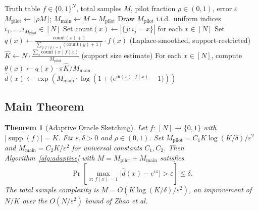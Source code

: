 \documentclass[11pt]{article}
\newtheorem{theorem}{Theorem}
\DeclareMathOperator{\supp}{supp}
\newcommand{\eps}{\varepsilon}
\begin{document}
\begin{algorithm}[H]
\caption{Adaptive Oracle Sketch for $K$-Sparse $f$}
\label{alg:adaptive}
\begin{algorithmic}[1]
\Require Truth table $f\in\{0,1\}^N$, total samples $M$, pilot fraction $\rho\in(0,1)$, error $\eps$
\State $M_{\mathrm{pilot}} \leftarrow \lfloor\rho M\rfloor$; $M_{\mathrm{main}} \leftarrow M - M_{\mathrm{pilot}}$
\State Draw $M_{\mathrm{pilot}}$ i.i.d.\ uniform indices $i_1,\ldots,i_{M_{\mathrm{pilot}}}\in[N]$
\State Set $\mathrm{count}(x) \leftarrow |\{j: i_j = x\}|$ for each $x\in[N]$
\State Set $q(x) \leftarrow \frac{\mathrm{count}(x)+1}{\sum_{y:f(y)=1}(\mathrm{count}(y)+1)}\cdot f(x)$ \quad (Laplace-smoothed, support-restricted)
\State $\hat{K} \leftarrow N\cdot \frac{\sum_{x}\mathrm{count}(x)f(x)}{M_{\mathrm{pilot}}}$ \quad (support size estimate)
\State For each $x\in[N]$, compute $\theta(x) \leftarrow q(x)\cdot\pi\hat{K}/M_{\mathrm{main}}$
\State \Return $\hat{d}(x) \leftarrow \exp\!\left(M_{\mathrm{main}}\cdot\log\!\left(1 + \bigl(e^{i\theta(x)\cdot f(x)} - 1\bigr)\right)\right)$
\end{algorithmic}
\end{algorithm}

\subsection{Main Theorem}

\begin{theorem}[Adaptive Oracle Sketching]\label{thm:adaptive}
Let $f:\,[N]\to\{0,1\}$ with $|\supp(f)| = K$.  Fix $\eps,\delta > 0$ and $\rho\in(0,1)$.  Set $M_{\mathrm{pilot}} = C_1 K\log(K/\delta)/\eps^2$ and $M_{\mathrm{main}} = C_2 K/\eps^2$ for universal constants $C_1, C_2$.  Then Algorithm~\ref{alg:adaptive} with $M = M_{\mathrm{pilot}} + M_{\mathrm{main}}$ satisfies
\[
  \Pr\!\left[\max_{x:\,f(x)=1}\bigl|\hat{d}(x) - e^{i\pi}\bigr| > \eps\right] \leq \delta.
\]
The total sample complexity is $M = O(K\log(K/\delta)/\eps^2)$, an improvement of $N/K$ over the $O(N/\eps^2)$ bound of Zhao et al.
\end{theorem}
\end{document}
